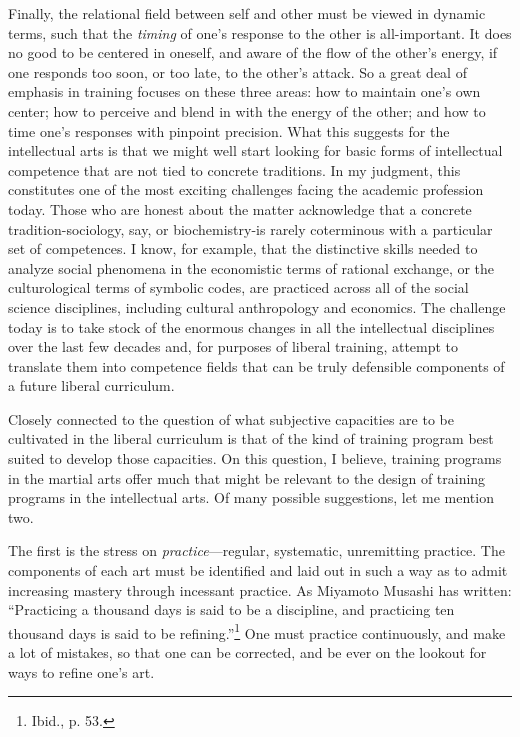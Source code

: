 Finally, the relational field between self and other must be viewed in dynamic terms, such that the \emph{timing} of one's response to the other is all-important. It does no good to be centered in oneself, and aware of the flow of the other's energy, if one responds too soon, or too late, to the other's attack. So a great deal of emphasis in training focuses on these three areas: how to maintain one's own center; how to perceive and blend in with the energy of the other; and how to time one's responses with pinpoint precision. What this suggests for the intellectual arts is that we might well start looking for basic forms of intellectual competence that are not tied to concrete traditions. In my judgment, this constitutes one of the most exciting challenges facing the academic profession today. Those who are honest about the matter acknowledge that a concrete tradition-sociology, say, or biochemistry-is rarely coterminous with a particular set of competences. I know, for example, that the distinctive skills needed to analyze social phenomena in the economistic terms of rational exchange, or the culturological terms of symbolic codes, are practiced across all of the social science disciplines, including cultural anthropology and economics. The challenge today is to take stock of the enormous changes in all the intellectual disciplines over the last few decades and, for purposes of liberal training, attempt to translate them into competence fields that can be truly defensible components of a future liberal curriculum.

Closely connected to the question of what subjective capacities are to be cultivated in the liberal curriculum is that of the kind of training program best suited to develop those capacities. On this question, I believe, training programs in the martial arts offer much that might be relevant to the design of training programs in the intellectual arts. Of many possible suggestions, let me mention two. 

The first is the stress on \emph{practice}---regular, systematic, unremitting practice. The components of each art must be identified and laid out in such a way as to admit increasing mastery through incessant practice. As Miyamoto Musashi has written: ``Practicing a thousand days is said to be a discipline, and practicing ten thousand days is said to be refining.''\footnote{Ibid., p. 53.} One must practice continuously, and make a lot of mistakes, so that one can be corrected, and be ever on the lookout for ways to refine one's art. 

